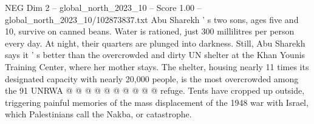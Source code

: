\begin{textsample}{NEG Dim 2 – global\_north\_2023\_10 – Score 1.00 – global\_north\_2023\_10/102873837.txt}
Abu Sharekh ' s two sons, ages five and 10, survive on canned beans.
Water is rationed, just 300 millilitres per person every day.
At night, their quarters are plunged into darkness.
Still, Abu Sharekh says it ' s better than the overcrowded and dirty UN shelter at the Khan Younis Training Center, where her mother stays.
The shelter, housing nearly 11 times its designated capacity with nearly 20,000 people, is the most overcrowded among the 91 UNRWA @ @ @ @ @ @ @ @ @ @ refuge.
Tents have cropped up outside, triggering painful memories of the mass displacement of the 1948 war with Israel, which Palestinians call the Nakba, or catastrophe.

\end{textsample}
